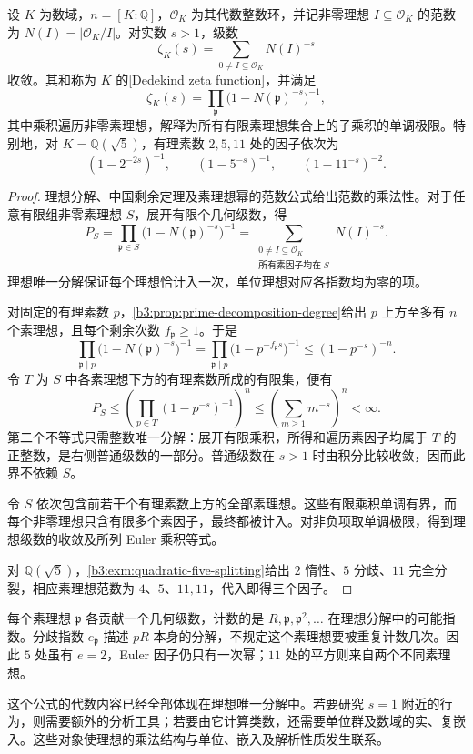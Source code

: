 \begin{proposition}\label{b3:prop:dedekind-zeta-euler}\label{b3:prop:quadratic-five-euler-factors}
	设 \(K\) 为数域，\(n=[K:\mathbb Q]\)，\(\mathcal O_K\) 为其代数整数环，并记非零理想 \(I\subseteq\mathcal O_K\) 的范数为 \(N(I)=|\mathcal O_K/I|\)。对实数 \(s>1\)，级数
	\[
		\zeta_K(s)=\sum_{0\ne I\subseteq\mathcal O_K}N(I)^{-s}
	\]
	收敛。其和称为 \(K\) 的[Dedekind zeta function]，并满足
	\[
		\zeta_K(s)=\prod_{\mathfrak p} \bigl(1-N(\mathfrak p)^{-s}\bigr)^{-1},
	\]
	其中乘积遍历非零素理想，解释为所有有限素理想集合上的子乘积的单调极限。特别地，对 \(K=\mathbb Q(\sqrt5)\)，有理素数 \(2,5,11\) 处的因子依次为
	\[
		(1-2^{-2s})^{-1},\qquad(1-5^{-s})^{-1},\qquad(1-11^{-s})^{-2}.
	\]
\end{proposition}
\begin{proof}
	理想分解、中国剩余定理及素理想幂的范数公式给出范数的乘法性。对于任意有限组非零素理想 \(S\)，展开有限个几何级数，得
	\[
		P_S=\prod_{\mathfrak p\in S} \bigl(1-N(\mathfrak p)^{-s}\bigr)^{-1} =\sum_{\substack{0\ne I\subseteq\mathcal O_K\\
				\text{所有素因子均在}\;S}}N(I)^{-s}.
	\]
	理想唯一分解保证每个理想恰计入一次，单位理想对应各指数均为零的项。

	对固定的有理素数 \(p\)，\cref{b3:prop:prime-decomposition-degree}给出 \(p\) 上方至多有 \(n\) 个素理想，且每个剩余次数 \(f_{\mathfrak p}\ge1\)。于是
	\[
		\prod_{\mathfrak p\mid p} \bigl(1-N(\mathfrak p)^{-s}\bigr)^{-1} =\prod_{\mathfrak p\mid p} \bigl(1-p^{-f_{\mathfrak p}s}\bigr)^{-1} \le(1-p^{-s})^{-n}.
	\]
	令 \(T\) 为 \(S\) 中各素理想下方的有理素数所成的有限集，便有
	\[
		P_S\le\left(\prod_{p\in T}(1-p^{-s})^{-1}\right)^n \le\left(\sum_{m\ge1}m^{-s}\right)^n<\infty.
	\]
	第二个不等式只需整数唯一分解：展开有限乘积，所得和遍历素因子均属于 \(T\) 的正整数，是右侧普通级数的一部分。普通级数在 \(s>1\) 时由积分比较收敛，因而此界不依赖 \(S\)。

	令 \(S\) 依次包含前若干个有理素数上方的全部素理想。这些有限乘积单调有界，而每个非零理想只含有限多个素因子，最终都被计入。对非负项取单调极限，得到理想级数的收敛及所列 Euler 乘积等式。

	对 \(\mathbb Q(\sqrt5)\)，\cref{b3:exm:quadratic-five-splitting}给出 \(2\) 惰性、\(5\) 分歧、\(11\) 完全分裂，相应素理想范数为 \(4\)、\(5\)、\(11,11\)，代入即得三个因子。
\end{proof}

每个素理想 \(\mathfrak p\) 各贡献一个几何级数，计数的是 \(R,\mathfrak p,\mathfrak p^2,\ldots\) 在理想分解中的可能指数。分歧指数 \(e_{\mathfrak p}\) 描述 \(pR\) 本身的分解，不规定这个素理想要被重复计数几次。因此 \(5\) 处虽有 \(e=2\)，Euler 因子仍只有一次幂；\(11\) 处的平方则来自两个不同素理想。

这个公式的代数内容已经全部体现在理想唯一分解中。若要研究 \(s=1\) 附近的行为，则需要额外的分析工具；若要由它计算类数，还需要单位群及数域的实、复嵌入。这些对象使理想的乘法结构与单位、嵌入及解析性质发生联系。
